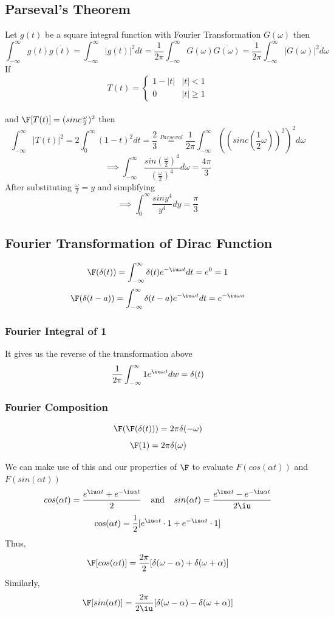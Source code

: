 \documentclass[11pt]{article}
\theoremstyle{definition}
\begin{document}
\subsection{Parseval's Theorem}
Let $g(t)$ be a square integral function with Fourier Transformation $G(\omega)$ then
$$\int_{-\infty}^\infty g(t) \overline{g(t)} = \int_{-\infty}^\infty |g(t)|^2dt = \frac{1}{2\pi}\int_{-\infty}^\infty G(\omega) \overline{G(\omega)} = \frac{1}{2\pi} \int_{-\infty}^\infty |G(\omega)|^2 d\omega$$
If
\[T(t) =  \begin{cases}
      1-|t| & |t| < 1 \\
      0 & |t| \geq 1
   \end{cases}
\]\\ and $\F[T(t)] = (sinc\frac{\omega}{2})^2$
then
$$\int_{-\infty}^\infty |T(t)|^2 = 2\int_{0}^\infty (1-t)^2 dt = \frac{2}{3} \stackrel{Parseval}{=} \frac{1}{2\pi}\int_{-\infty}^\infty ((sinc(\frac{1}{2}\omega))^2)^2 d\omega$$
$$\implies \int_{-\infty}^\infty \frac{sin(\frac{\omega}{2})^4}{(\frac{\omega}{2})^4}d\omega = \frac{4\pi}{3}$$
After substituting $\frac{\omega}{2} = y$ and simplifying
$$\implies \int_0^\infty \frac{siny^4}{y^4}dy = \frac{\pi}{3}$$

\newpage
\subsection{Fourier Transformation of Dirac Function}
$$\F(\delta(t)) = \int_{-\infty}^\infty \delta(t) e^{-\iu \omega t }dt = e^0 = 1$$
$$\F(\delta(t-a)) = \int_{-\infty}^\infty \delta(t-a) e^{-\iu \omega t }dt = e^{-\iu \omega a} $$
\subsubsection{Fourier Integral of 1}
It gives us the reverse of the transformation above
$$\frac{1}{2\pi} \int_{-\infty}^\infty 1e^{\iu \omega t} dw = \delta(t)$$
\subsubsection{Fourier Composition}
$$\F(\F(\delta(t))) = 2\pi \delta(-\omega)$$
$$\F(1) = 2\pi \delta(\omega)$$

We can make use of this and our properties of $\F$ to evaluate $F(cos(\alpha t))$ and $F(sin(\alpha t))$
$$cos(\alpha t) = \frac{e^{\iu \alpha t} + e^{-\iu \alpha t}}{2} \;\;\;\;\text{and}\;\;\;\; sin(\alpha t) = \frac{e^{\iu \alpha t} - e^{-\iu \alpha t}}{2\iu}$$
$$\cos(\alpha t) = \frac{1}{2}[e^{\iu \alpha t}\cdot 1 + e^{-\iu \alpha t}\cdot 1]$$
Thus,
$$\F[cos(\alpha t)] = \frac{2\pi}{2}[\delta (\omega - \alpha) + \delta(\omega + \alpha)]$$
Similarly,
$$\F[sin(\alpha t)] = \frac{2\pi}{2\iu} [\delta(\omega - \alpha) - \delta(\omega + \alpha)]$$
\end{document}
